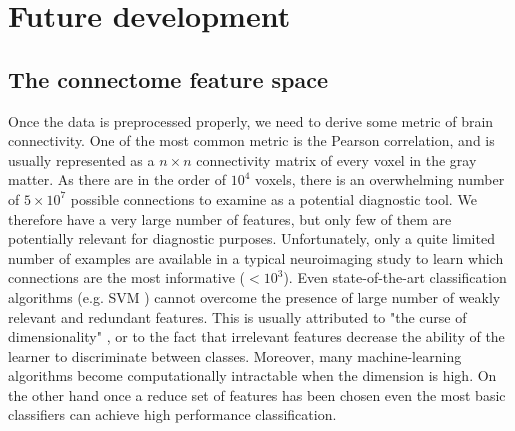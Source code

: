 

\chapter{Future development}

\section{The connectome feature space} Once the data is preprocessed properly, we need to derive some metric of brain connectivity. One of the most common metric is the Pearson correlation, and is usually represented as a $n\times n$ connectivity matrix of every voxel in the gray matter. As there are in the order of $10^4$ voxels, there is an overwhelming number of $5\times10^7$ possible connections to examine as a potential diagnostic tool. We therefore have a very large number of features, but only few of them are potentially relevant for diagnostic purposes. Unfortunately, only a quite limited number of examples are available in a typical neuroimaging study to learn which connections are the most informative ($<10^3$). Even state-of-the-art classification algorithms (e.g. SVM \citep{Cortes1995}) cannot overcome the presence of large number of weakly relevant and redundant features. This is usually attributed to "the curse of dimensionality" \citep{Bellman1961}, or to the fact that irrelevant features 
decrease the ability of the learner to discriminate between classes. Moreover, many machine-learning algorithms become computationally intractable when the dimension is high. On the other hand once a reduce set of features has been chosen even the most basic classifiers can achieve high performance classification.


